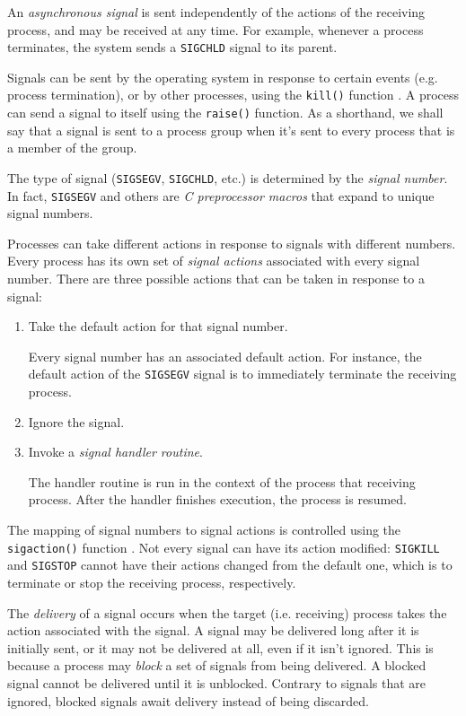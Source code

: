 \documentclass[shortabstract, manyadvisors, english, mgr]{iithesis}
\begin{document}
An \textit{asynchronous signal} is sent independently of the actions of the
receiving process, and may be received at any time. For example, whenever a
process terminates, the system sends a \texttt{SIGCHLD} signal to its parent.

Signals can be sent by the operating system in response to certain events (e.g.
process termination), or by other processes, using the \texttt{kill()} function
\cite{kill}. A process can send a signal to itself using the \texttt{raise()}
function. As a shorthand, we shall say that a signal is sent to a process
group when it's sent to every process that is a member of the group.

The type of signal (\texttt{SIGSEGV}, \texttt{SIGCHLD}, etc.) is determined by
the \textit{signal number}. In fact, \texttt{SIGSEGV} and others are \textit{C
  preprocessor macros} that expand to unique signal numbers.

Processes can take different actions in response to signals with different
numbers. Every process has its own set of \textit{signal actions} associated
with every signal number. There are three possible actions that can be taken in
response to a signal:
\begin{enumerate}
\item Take the default action for that signal number.
  
  Every signal number has an associated default action. For instance, the
  default action of the \texttt{SIGSEGV} signal is to immediately terminate the
  receiving process.
\item Ignore the signal.
\item Invoke a \textit{signal handler routine}.

  The handler routine is run in the context of the process that receiving
  process. After the handler finishes execution, the process is resumed.
\end{enumerate}

The mapping of signal numbers to signal actions is controlled using the
\texttt{sigaction()} function \cite{sigaction}. Not every signal can have its
action modified: \texttt{SIGKILL} and \texttt{SIGSTOP} cannot have their actions
changed from the default one, which is to terminate or stop the receiving process,
respectively.

The \textit{delivery} of a signal occurs when the target (i.e. receiving)
process takes the action associated with the signal. A signal may be delivered
long after it is initially sent, or it may not be delivered at all, even if it
isn't ignored. This is because a process may \textit{block} a set of signals
from being delivered. A blocked signal cannot be delivered until it is
unblocked. Contrary to signals that are ignored, blocked signals await delivery
instead of being discarded.
\end{document}
